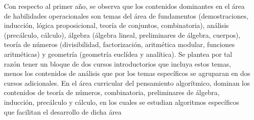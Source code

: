 \begin{refsection}
Con respecto al primer año, se observa que los contenidos dominantes en el área de habilidades operacionales son temas del área de fundamentos (demostraciones, inducción, lógica proposicional, teoría de conjuntos, combinatoria), análisis (precálculo, cálculo), álgebra (álgebra lineal, preliminares de álgebra, cuerpos), teoría de números (divisibilidad, factorización, aritmética modular, funciones aritméticas) y geometría (geometría euclídea y analítica). Se plantea por tal razón tener un bloque de dos cursos introductorios que incluya estos temas, menos los contenidos de análisis que por los temas específicos se agruparan en dos cursos adicionales. En el área curricular del pensamiento algorítmico, dominan los contenidos de teoría de números, combinatoria, preliminares de álgebra, inducción, precálculo y cálculo, en los cuales se estudian algoritmos específicos que facilitan el desarrollo de dicha área


\end{refsection}
